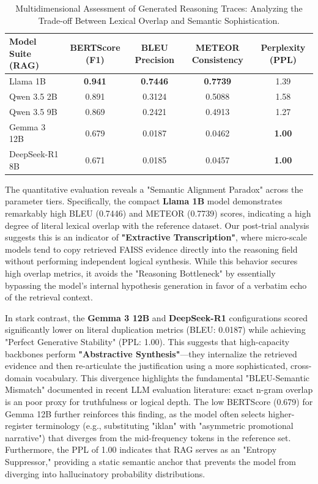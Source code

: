\documentclass{ieeeaccess}
\begin{document}
\begin{table}[t]
\caption{Multidimensional Assessment of Generated Reasoning Traces: Analyzing the Trade-off Between Lexical Overlap and Semantic Sophistication.}
\label{tab:reasoning_quality_metrics}
\begin{center}
\begin{tabular}{|l|c|c|c|c|}
\hline
\textbf{Model Suite (RAG)} & \textbf{BERTScore (F1)} & \textbf{BLEU Precision} & \textbf{METEOR Consistency} & \textbf{Perplexity (PPL)} \\
\hline
Llama 1B & \textbf{0.941} & \textbf{0.7446} & \textbf{0.7739} & 1.39 \\
Qwen 3.5 2B & 0.891 & 0.3124 & 0.5088 & 1.58 \\
Qwen 3.5 9B & 0.869 & 0.2421 & 0.4913 & 1.27 \\
Gemma 3 12B & 0.679 & 0.0187 & 0.0462 & \textbf{1.00} \\
DeepSeek-R1 8B & 0.671 & 0.0185 & 0.0457 & \textbf{1.00} \\
\hline
\end{tabular}
\end{center}
\end{table}

The quantitative evaluation reveals a "Semantic Alignment Paradox" across the parameter tiers. Specifically, the compact \textbf{Llama 1B} model demonstrates remarkably high BLEU (0.7446) and METEOR (0.7739) scores, indicating a high degree of literal lexical overlap with the reference dataset. Our post-trial analysis suggests this is an indicator of \textbf{"Extractive Transcription"}, where micro-scale models tend to copy retrieved FAISS evidence directly into the reasoning field without performing independent logical synthesis. While this behavior secures high overlap metrics, it avoids the "Reasoning Bottleneck" by essentially bypassing the model's internal hypothesis generation in favor of a verbatim echo of the retrieval context.

In stark contrast, the \textbf{Gemma 3 12B} and \textbf{DeepSeek-R1} configurations scored significantly lower on literal duplication metrics (BLEU: 0.0187) while achieving "Perfect Generative Stability" (PPL: 1.00). This suggests that high-capacity backbones perform \textbf{"Abstractive Synthesis"}—they internalize the retrieved evidence and then re-articulate the justification using a more sophisticated, cross-domain vocabulary. This divergence highlights the fundamental "BLEU-Semantic Mismatch" documented in recent LLM evaluation literature: exact n-gram overlap is an poor proxy for truthfulness or logical depth. The low BERTScore (0.679) for Gemma 12B further reinforces this finding, as the model often selects higher-register terminology (e.g., substituting "iklan" with "asymmetric promotional narrative") that diverges from the mid-frequency tokens in the reference set. Furthermore, the PPL of 1.00 indicates that RAG serves as an "Entropy Suppressor," providing a static semantic anchor that prevents the model from diverging into hallucinatory probability distributions.
\end{document}
